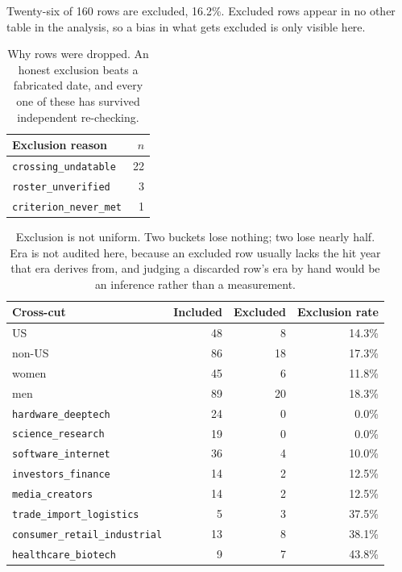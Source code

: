 \documentclass[11pt]{article}
\begin{document}
Twenty-six of 160 rows are excluded, 16.2\%. Excluded rows appear in no other
table in the analysis, so a bias in what gets excluded is only visible here.

\begin{table}[h]
\centering
\begin{tabular}{lr}
\toprule
Exclusion reason & $n$ \\
\midrule
\texttt{crossing\_undatable}   & 22 \\
\texttt{roster\_unverified}    & 3 \\
\texttt{criterion\_never\_met} & 1 \\
\bottomrule
\end{tabular}
\caption{Why rows were dropped. An honest exclusion beats a fabricated date,
and every one of these has survived independent re-checking.}
\end{table}

\begin{table}[h]
\centering
\begin{tabular}{lrrr}
\toprule
Cross-cut & Included & Excluded & Exclusion rate \\
\midrule
US     & 48 & 8  & 14.3\% \\
non-US & 86 & 18 & 17.3\% \\
women  & 45 & 6  & 11.8\% \\
men    & 89 & 20 & 18.3\% \\
\midrule
\texttt{hardware\_deeptech}           & 24 & 0 & 0.0\% \\
\texttt{science\_research}            & 19 & 0 & 0.0\% \\
\texttt{software\_internet}           & 36 & 4 & 10.0\% \\
\texttt{investors\_finance}           & 14 & 2 & 12.5\% \\
\texttt{media\_creators}              & 14 & 2 & 12.5\% \\
\texttt{trade\_import\_logistics}     & 5  & 3 & 37.5\% \\
\texttt{consumer\_retail\_industrial} & 13 & 8 & 38.1\% \\
\texttt{healthcare\_biotech}          & 9  & 7 & 43.8\% \\
\bottomrule
\end{tabular}
\caption{Exclusion is not uniform. Two buckets lose nothing; two lose nearly
half. Era is not audited here, because an excluded row usually lacks the hit
year that era derives from, and judging a discarded row's era by hand would be
an inference rather than a measurement.}
\end{table}
\end{document}
